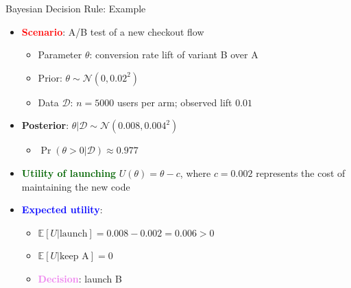 \documentclass[
  10pt,
  ignorenonframetext,
]{beamer}
\providecommand{\tightlist}{%
  \setlength{\itemsep}{0pt}\setlength{\parskip}{0pt}}
\newcommand{\EE}{\mathbb{E}}
\begin{document}
\begin{frame}{Bayesian Decision Rule: Example}
\label{bayesian-decision-rule-example}
\begin{itemize}
\item
  \textbf{\textcolor{red}{Scenario}}: A/B test of a new checkout flow

  \begin{itemize}
  \tightlist
  \item
    Parameter \(\theta\): conversion rate lift of variant B over A
  \item
    Prior: \(\theta \sim \mathcal{N}(0, 0.02^2)\)
  \item
    Data \(\mathcal{D}\): \(n = 5000\) users per arm; observed lift
    \(0.01\)
  \end{itemize}
\item
  \textbf{Posterior}:
  \(\theta | \mathcal{D} \sim \mathcal{N}(0.008, 0.004^2)\)

  \begin{itemize}
  \tightlist
  \item
    \(\Pr(\theta > 0 | \mathcal{D}) \approx 0.977\)
  \end{itemize}
\item
  \textbf{\textcolor{darkgreen}{Utility of launching}}
  \(U(\theta) = \theta - c\), where \(c = 0.002\) represents the cost of
  maintaining the new code
\item
  \textbf{\textcolor{blue}{Expected utility}}:

  \begin{itemize}
  \tightlist
  \item
    \(\EE[U | \text{launch}] = 0.008 - 0.002 = 0.006 > 0\)
  \item
    \(\EE[U | \text{keep A}] = 0\)
  \item
    \textbf{\textcolor{violet}{Decision}}: launch B
  \end{itemize}
\end{itemize}
\end{frame}
\end{document}
